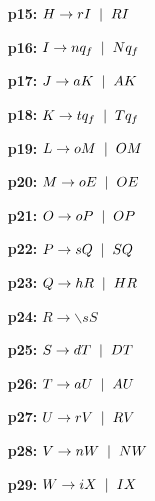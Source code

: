 \documentclass[a4paper,10pt]{article}
\begin{document}
\begin{itemize}
		\item[\textbf{p15:}] $H \to rI \hspace{2mm} | \hspace{2mm} RI$
		\item[\textbf{p16:}] $I \to nq_{f} \hspace{2mm} | \hspace{2mm} Nq_{f}$
		\item[\textbf{p17:}] $J \to aK \hspace{2mm} | \hspace{2mm} AK$
		\item[\textbf{p18:}] $K \to tq_{f} \hspace{2mm} | \hspace{2mm} Tq_{f}$
		\item[\textbf{p19:}] $L \to oM \hspace{2mm} | \hspace{2mm} OM$
		\item[\textbf{p20:}] $M \to oE \hspace{2mm} | \hspace{2mm} OE$
		\item[\textbf{p21:}] $O \to oP \hspace{2mm} | \hspace{2mm} OP$
		\item[\textbf{p22:}] $P \to sQ \hspace{2mm} | \hspace{2mm} SQ$
		\item[\textbf{p23:}] $Q \to hR \hspace{2mm} | \hspace{2mm} HR$
		\item[\textbf{p24:}] $R \to \backslash sS $
		\item[\textbf{p25:}] $S \to dT \hspace{2mm} | \hspace{2mm} DT$
		\item[\textbf{p26:}] $T \to aU \hspace{2mm} | \hspace{2mm} AU$
		\item[\textbf{p27:}] $U \to rV \hspace{2mm} | \hspace{2mm} RV$
		\item[\textbf{p28:}] $V \to nW \hspace{2mm} | \hspace{2mm} NW$
		\item[\textbf{p29:}] $W \to iX \hspace{2mm} | \hspace{2mm} IX$

\end{itemize}
\end{document}
